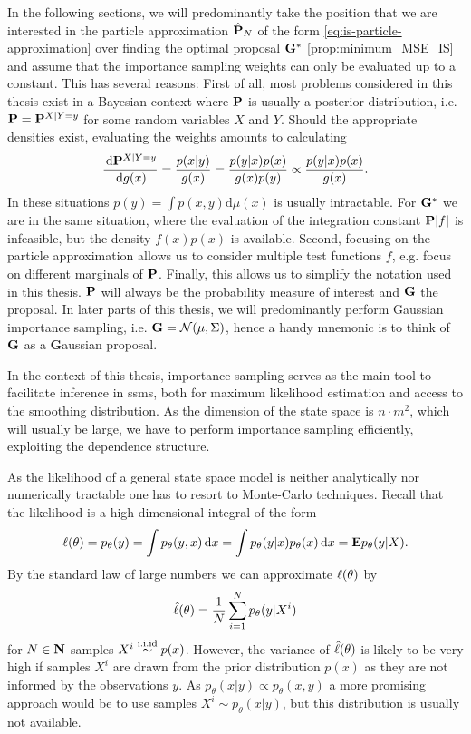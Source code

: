 In the following sections, we will predominantly take the position that we are interested in the particle approximation $\hat\P_{N}$ of the form \cref{eq:is-particle-approximation} over finding the optimal proposal $\G^{\ast}$ \cref{prop:minimum_MSE_IS} and assume that the importance sampling weights can only be evaluated up to a constant. 
This has several reasons: First of all, most problems considered in this thesis exist in a Bayesian context where $\P$ is usually a posterior distribution, i.e. $\P = \P^{X|Y=y}$ for some random variables $X$ and $Y$. Should the appropriate densities exist, evaluating the weights amounts to calculating 
$$
\rnd{\P^{X| Y= y}}{g(x)} = \frac{p(x|y)}{g(x)} = \frac{p(y|x)p(x)}{g(x)p(y)} \propto \frac{p(y|x)p(x)}{g(x)}.
$$
In these situations $p(y) = \int p(x,y)\mathrm d \mu(x)$ is usually intractable. For $\G^{\ast}$ we are in the same situation, where the evaluation of the integration constant $\P \lvert f \rvert$ is infeasible, but the density $f(x)p(x)$ is available.
Second, focusing on the particle approximation allows us to consider multiple test functions $f$, e.g. focus on different marginals of $\P$. 
Finally, this allows us to simplify the notation used in this thesis. $\P$ will always be the probability measure of interest and $\G$ the proposal. In later parts of this thesis, we will predominantly perform Gaussian importance sampling, i.e. $\G = \mathcal N(\mu, \Sigma)$, hence a handy mnemonic is to think of $\G$ as a \textbf{G}aussian proposal.


In the context of this thesis, importance sampling serves as the main tool to facilitate inference in \glspl{ssm}, both for maximum likelihood estimation and access to the smoothing distribution. As the dimension of the state space is $n\cdot m^{2}$, which will usually be large, we have to perform importance sampling efficiently, exploiting the dependence structure. 

As the likelihood of a general state space model is neither analytically nor numerically tractable one has to resort to Monte-Carlo techniques.
Recall that the likelihood is a high-dimensional integral of the form
\begin{align*}
    \lik(\theta) = p_\theta(y) = \int p_\theta(y,x) \d x = \int p_\theta(y|x) p_\theta(x) \d x = \E p_\theta(y|X).
\end{align*}
By the standard law of large numbers we can approximate $\lik(\theta)$ by
\begin{align*}
    \hat\lik(\theta) = \frac 1 N \sum_{i=1}^N p_\theta(y|X^i)
\end{align*}
for $N\in\N$ samples $X^i \iid p(x)$.
However, the variance of $\hat\lik(\theta)$ is likely to be very high if samples $X^i$ are drawn from the prior distribution $p(x)$ as they are not informed by the observations $y$.
As $p_\theta(x|y) \propto p_\theta(x,y)$ a more promising approach would be to use samples $X^i \sim p_\theta(x|y)$, but this distribution is usually not available.

